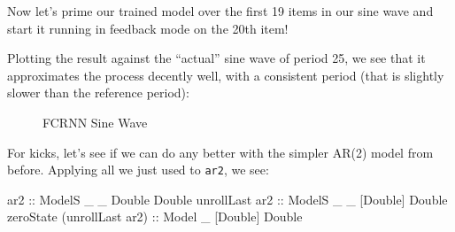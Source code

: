 \documentclass[]{article}
\newenvironment{Shaded}{}{}
\newcommand{\CommentTok}[1]{\textcolor[rgb]{0.38,0.63,0.69}{\textit{#1}}}
\newcommand{\DataTypeTok}[1]{\textcolor[rgb]{0.56,0.13,0.00}{#1}}
\newcommand{\DecValTok}[1]{\textcolor[rgb]{0.25,0.63,0.44}{#1}}
\newcommand{\FloatTok}[1]{\textcolor[rgb]{0.25,0.63,0.44}{#1}}
\newcommand{\FunctionTok}[1]{\textcolor[rgb]{0.02,0.16,0.49}{#1}}
\newcommand{\KeywordTok}[1]{\textcolor[rgb]{0.00,0.44,0.13}{\textbf{#1}}}
\newcommand{\NormalTok}[1]{#1}
\newcommand{\OperatorTok}[1]{\textcolor[rgb]{0.40,0.40,0.40}{#1}}
\newcommand{\OtherTok}[1]{\textcolor[rgb]{0.00,0.44,0.13}{#1}}
\begin{document}
Now let's prime our trained model over the first 19 items in our sine wave and
start it running in feedback mode on the 20th item!

\begin{Shaded}
\end{Shaded}

Plotting the result against the ``actual'' sine wave of period 25, we see that
it approximates the process decently well, with a consistent period (that is
slightly slower than the reference period):

\begin{figure}
\centering
{}
\caption{FCRNN Sine Wave}
\end{figure}

For kicks, let's see if we can do any better with the simpler AR(2) model from
before. Applying all we just used to \texttt{ar2}, we see:

\begin{Shaded}
\begin{Highlighting}[]
\OtherTok{ar2                        ::} \DataTypeTok{ModelS}\NormalTok{ \_ \_  }\DataTypeTok{Double}  \DataTypeTok{Double}
\NormalTok{unrollLast}\OtherTok{ ar2             ::} \DataTypeTok{ModelS}\NormalTok{ \_ \_ [}\DataTypeTok{Double}\NormalTok{] }\DataTypeTok{Double}
\NormalTok{zeroState (unrollLast ar2)}\OtherTok{ ::} \DataTypeTok{Model}\NormalTok{  \_   [}\DataTypeTok{Double}\NormalTok{] }\DataTypeTok{Double}
\end{Highlighting}
\end{Shaded}
\end{document}
